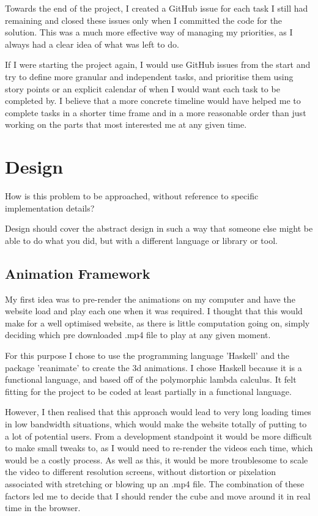 \documentclass{l4proj}
\begin{document}
Towards the end of the project, I created a GitHub issue for each task I still had remaining and closed these issues only when I committed the code for the solution.  This was a much more effective way of managing my priorities, as I always had a clear idea of what was left to do.

If I were starting the project again, I would use GitHub issues from the start and try to define more granular and independent tasks, and prioritise them using story points or an explicit calendar of when I would want each task to be completed by.  I believe that a more concrete timeline would have helped me to complete tasks in a shorter time frame and in a more reasonable order than just working on the parts that most interested me at any given time.


\chapter{Design}
How is this problem to be approached, without reference to specific implementation 
details? 

Design should cover the abstract design in such a way that someone else might be able to do what you did, but with a different language or library or tool.

\section{Animation Framework}

My first idea was to pre-render the animations on my computer and have the website load and play each one when it was required.  I thought that this would make for a well optimised website, as there is little computation going on, simply deciding which pre downloaded .mp4 file to play at any given moment.  

For this purpose I chose to use the programming language 'Haskell' and the package 'reanimate' to create the 3d animations.  I chose Haskell because it is a functional language, and based off of the polymorphic lambda calculus.  It felt fitting for the project to be coded at least partially in a functional language.

However, I then realised that this approach would lead to very long loading times in low bandwidth situations, which would make the website totally of putting to a lot of potential users.  From a development standpoint it would be more difficult to make small tweaks to, as I would need to re-render the videos each time, which would be a costly process.  As well as this, it would be more troublesome to scale the video to different resolution screens, without distortion or pixelation associated with stretching or blowing up an .mp4 file.  The combination of these factors led me to decide that I should render the cube and move around it in real time in the browser.
\end{document}
